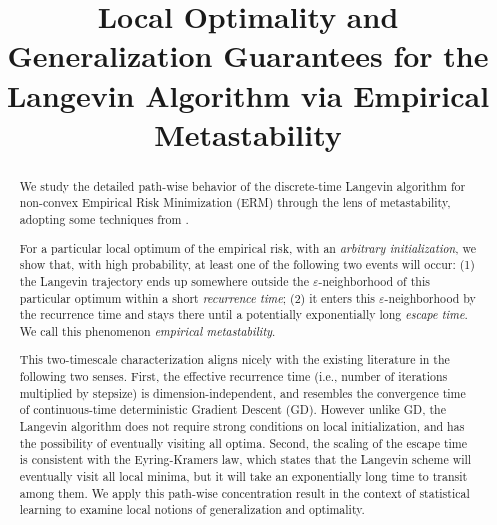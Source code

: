 \documentclass[final,12pt]{colt2018}
\title[Empirical metastability of Langevin algorithm]{Local Optimality and Generalization Guarantees for the Langevin Algorithm via Empirical Metastability}
\numberwithin{equation}{section}
\numberwithin{equation}{section}
\def\eps{\varepsilon}
\begin{document}
\maketitle

\begin{abstract} We study the detailed path-wise behavior of the discrete-time Langevin algorithm for non-convex Empirical Risk Minimization (ERM) through the lens of metastability, adopting some techniques from \cite{berglund_gentz_pathwise}.
	
	For a particular local optimum of the empirical risk, with an \textit{arbitrary initialization}, we show that, with high probability, at least one of the following two events will occur: (1) the Langevin trajectory ends up somewhere outside the $\eps$-neighborhood of this particular optimum within a short \textit{recurrence time}; (2) it enters this $\eps$-neighborhood by the recurrence time and stays there until a potentially exponentially long \textit{escape time}. We call this phenomenon \textit{empirical metastability}.
	
This two-timescale characterization aligns nicely with the existing literature in the following two senses. First, the effective recurrence time (i.e., number of iterations multiplied by stepsize) is dimension-independent, and resembles the convergence time of continuous-time deterministic Gradient Descent (GD). However unlike GD, the Langevin algorithm does not require strong conditions on local initialization, and has the possibility of eventually visiting all optima. Second, the scaling of the escape time is consistent with the Eyring-Kramers law, which states that the Langevin scheme will eventually visit all local minima, but it will take an exponentially long time to transit among them.
We apply this path-wise concentration result in the context of statistical learning to examine local notions of generalization and optimality. 

\end{abstract}
\end{document}
